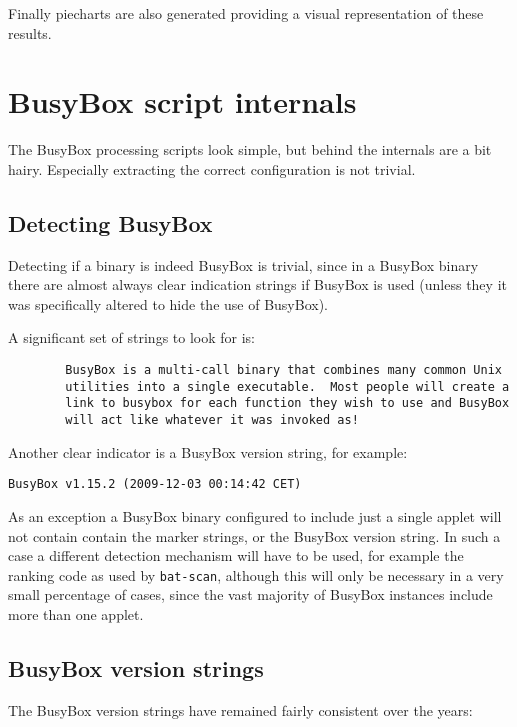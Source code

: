 \documentclass[10pt,a4paper]{article}
\begin{document}
Finally piecharts are also generated providing a visual representation of these results.

\section{BusyBox script internals}

The BusyBox processing scripts look simple, but behind the internals are a bit
hairy. Especially extracting the correct configuration is not trivial.

\subsection{Detecting BusyBox}

Detecting if a binary is indeed BusyBox is trivial, since in a BusyBox binary
there are almost always clear indication strings if BusyBox is used (unless
they it was specifically altered to hide the use of BusyBox).

A significant set of strings to look for is:

\begin{verbatim}
        BusyBox is a multi-call binary that combines many common Unix
        utilities into a single executable.  Most people will create a
        link to busybox for each function they wish to use and BusyBox
        will act like whatever it was invoked as!
\end{verbatim}

Another clear indicator is a BusyBox version string, for example:

\begin{verbatim}
BusyBox v1.15.2 (2009-12-03 00:14:42 CET)
\end{verbatim}

As an exception a BusyBox binary configured to include just a single applet
will not contain contain the marker strings, or the BusyBox version string. In
such a case a different detection mechanism will have to be used, for example
the ranking code as used by \texttt{bat-scan}, although this will only be
necessary in a very small percentage of cases, since the vast majority of
BusyBox instances include more than one applet.

\subsection{BusyBox version strings}

The BusyBox version strings have remained fairly consistent over the years:
\end{document}
